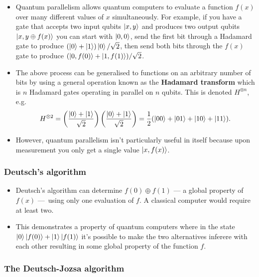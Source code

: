 \documentclass{article}
\begin{document}
\begin{itemize}
  \item Quantum parallelism allows quantum computers to evaluate a function $f(x)$ over many different values of $x$ simultaneously. For example, if you have a gate that accepts two input qubits $\ket{x, y}$ and produces two output qubits $\ket{x, y \oplus f(x)}$ you can start with $\ket{0, 0}$, send the first bit through a Hadamard gate to produce $(\ket{0} + \ket{1}) \ket{0} / \sqrt{2}$, then send both bits through the $f(x)$ gate to produce $(\ket{0, f(0)} + \ket{1, f(1)}) / \sqrt{2}$.

  \item The above process can be generalised to functions on an arbitrary number of bits by using a general operation known as the \textbf{Hadamard transform} which is $n$ Hadamard gates operating in parallel on $n$ qubits. This is denoted $H^{\otimes n}$, e.g. \[H^{\otimes 2} = \left( \frac{\ket{0} + \ket{1}}{\sqrt{2}} \right) \left( \frac{\ket{0} + \ket{1}}{\sqrt{2}} \right) = \frac{1}{2} (\ket{0 0} + \ket{0 1} + \ket{1 0} + \ket{1 1}).\]

  \item However, quantum parallelism isn't particularly useful in itself because upon measurement you only get a single value $\ket{x, f(x)}$.
\end{itemize}

\subsubsection{Deutsch's algorithm}

\begin{itemize}
  \item Deutsch's algorithm can determine $f(0) \oplus f(1)$ — a global property of $f(x)$ — using only one evaluation of $f$. A classical computer would require at least two.

  \item This demonstrates a property of quantum computers where in the state $\ket{0} \ket{f(0)} + \ket{1} \ket{f(1)}$ it's possible to make the two alternatives inferere with each other resulting in some global property of the function $f$.
\end{itemize}

\subsubsection{The Deutsch-Jozsa algorithm}
\end{document}
